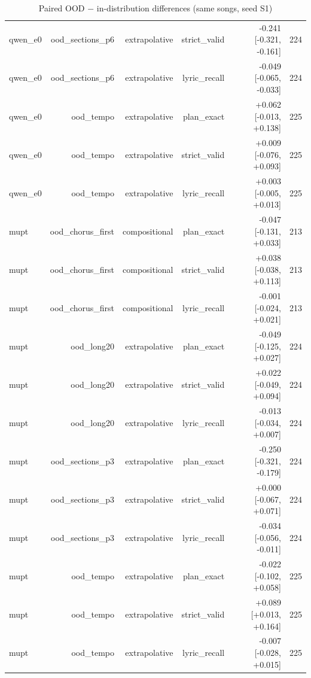 \begin{table}[t]
\begin{tabular}{lrrrrr}
qwen\_e0 & ood\_sections\_p6 & extrapolative & strict\_valid & -0.241 [-0.321, -0.161] & 224 \\
qwen\_e0 & ood\_sections\_p6 & extrapolative & lyric\_recall & -0.049 [-0.065, -0.033] & 224 \\
qwen\_e0 & ood\_tempo & extrapolative & plan\_exact & +0.062 [-0.013, +0.138] & 225 \\
qwen\_e0 & ood\_tempo & extrapolative & strict\_valid & +0.009 [-0.076, +0.093] & 225 \\
qwen\_e0 & ood\_tempo & extrapolative & lyric\_recall & +0.003 [-0.005, +0.013] & 225 \\
mupt & ood\_chorus\_first & compositional & plan\_exact & -0.047 [-0.131, +0.033] & 213 \\
mupt & ood\_chorus\_first & compositional & strict\_valid & +0.038 [-0.038, +0.113] & 213 \\
mupt & ood\_chorus\_first & compositional & lyric\_recall & -0.001 [-0.024, +0.021] & 213 \\
mupt & ood\_long20 & extrapolative & plan\_exact & -0.049 [-0.125, +0.027] & 224 \\
mupt & ood\_long20 & extrapolative & strict\_valid & +0.022 [-0.049, +0.094] & 224 \\
mupt & ood\_long20 & extrapolative & lyric\_recall & -0.013 [-0.034, +0.007] & 224 \\
mupt & ood\_sections\_p3 & extrapolative & plan\_exact & -0.250 [-0.321, -0.179] & 224 \\
mupt & ood\_sections\_p3 & extrapolative & strict\_valid & +0.000 [-0.067, +0.071] & 224 \\
mupt & ood\_sections\_p3 & extrapolative & lyric\_recall & -0.034 [-0.056, -0.011] & 224 \\
mupt & ood\_tempo & extrapolative & plan\_exact & -0.022 [-0.102, +0.058] & 225 \\
mupt & ood\_tempo & extrapolative & strict\_valid & +0.089 [+0.013, +0.164] & 225 \\
mupt & ood\_tempo & extrapolative & lyric\_recall & -0.007 [-0.028, +0.015] & 225 \\
\bottomrule
\end{tabular}
\caption{Paired OOD $-$ in-distribution differences (same songs, seed S1)}
\label{tab:ood_deltas}
\end{table}
